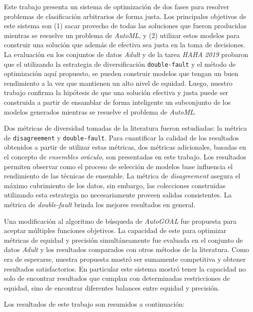 \begin{conclusions}

Este trabajo presenta un sistema de optimización de dos fases para resolver problemas de clasificación arbitrarios de forma justa.
Los principales objetivos de este sistema son (1) sacar provecho de todas las soluciones que fueron producidas mientras se resuelve un problema de \emph{AutoML}, y (2) utilizar estos modelos para construir una solución que además de efectiva sea justa en la toma de decisiones.
La evaluación en los conjuntos de datos \emph{Adult} y de la tarea \emph{HAHA 2019} probaron que el utilizando la estrategia de diversificación \texttt{double-fault} y el método de optimización aquí propuesto, se pueden construir modelos que tengan un buen rendimiento a la vez que mantienen un alto nivel de equidad.
Luego, nuestro trabajo confirma la hipótesis de que una solución efectiva y justa puede ser construida a partir de ensamblar de forma inteligente un subconjunto de los modelos generados mientras se resuelve el problema de \emph{AutoML}.

Dos métricas de diversidad tomadas de la literatura fueron estudiadas: la métrica de \texttt{disagreement} y \texttt{double-fault}.
Para cuantificar la calidad de los resultados obtenidos a partir de utilizar estas métricas, dos métricas adicionales, basadas en el concepto de \emph{ensembles oráculo}, son presentadas en este trabajo.
Los resultados permiten observar como el proceso de selección de modelos base influencia el rendimiento de las técnicas de ensemble.
La métrica de \emph{disagreement} asegura el máximo cubrimiento de los datos, sin embargo, las colecciones construidas utilizando esta estrategia no necesariamente proveen salidas consistentes.
La métrica de \emph{double-fault} brinda los mejores resultados en general.

Una modificación al algoritmo de búsqueda de \emph{AutoGOAL} fue propuesta para aceptar múltiples funciones objetivos.
La capacidad de este para optimizar métricas de equidad y precisión simultáneamente fue evaluada en el conjunto de datos \emph{Adult} y los resultados comparados con otros métodos de la literatura.
Como era de esperarse, nuestra propuesta mostró ser sumamente competitiva y obtener resultados satisfactorios.
En particular este sistema mostró tener la capacidad no solo de encontrar resultados que cumplan con determinadas restricciones de equidad, sino de encontrar diferentes balances entre equidad y precisión.

Los resultados de este trabajo son resumidos a continuación:


\end{conclusions}

